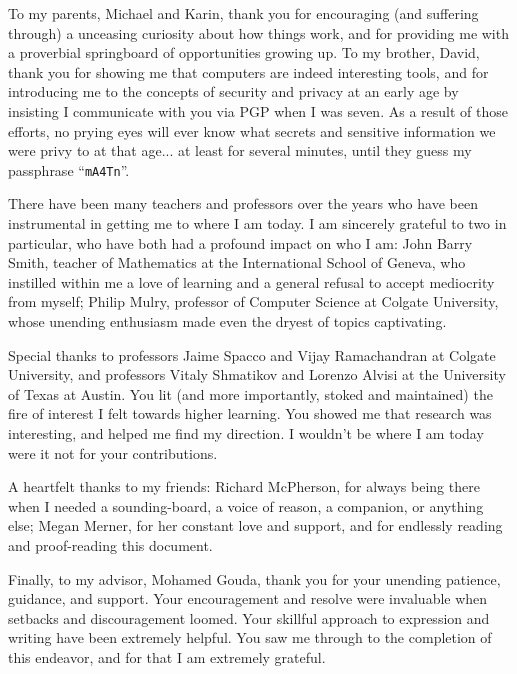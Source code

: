To my parents, Michael and Karin, thank you for encouraging (and suffering through) a unceasing curiosity about how things work,
    and for providing me with a proverbial springboard of opportunities growing up.
To my brother, David, thank you for showing me that computers are indeed interesting tools,
    and for introducing me to the concepts of security and privacy at an early age
    by insisting I communicate with you via PGP when I was seven.
As a result of those efforts, no prying eyes will ever know what secrets and sensitive information we were privy to at that age...
    at least for several minutes, until they guess my passphrase ``\texttt{mA4Tn}''.

There have been many teachers and professors over the years who have been instrumental in getting me to where I am today.
I am sincerely grateful to two in particular, who have both had a profound impact on who I am:
    John Barry Smith, teacher of Mathematics at the International School of Geneva,
        who instilled within me a love of learning and a general refusal to accept mediocrity from myself;
    Philip Mulry, professor of Computer Science at Colgate University,
        whose unending enthusiasm made even the dryest of topics captivating.

Special thanks to professors Jaime Spacco and Vijay Ramachandran at Colgate University,
    and professors Vitaly Shmatikov and Lorenzo Alvisi at the University of Texas at Austin.
You lit (and more importantly, stoked and maintained) the fire of interest I felt towards higher learning.
You showed me that research was interesting, and helped me find my direction.
I wouldn't be where I am today were it not for your contributions.

A heartfelt thanks to my friends:
    Richard McPherson, for always being there when I needed a sounding-board, a voice of reason, a companion, or anything else;
    Megan Merner, for her constant love and support, and for endlessly reading and proof-reading this document.

Finally, to my advisor, Mohamed Gouda, thank you for your unending patience, guidance, and support.
Your encouragement and resolve were invaluable when setbacks and discouragement loomed.
Your skillful approach to expression and writing have been extremely helpful.
You saw me through to the completion of this endeavor, and for that I am extremely grateful.
